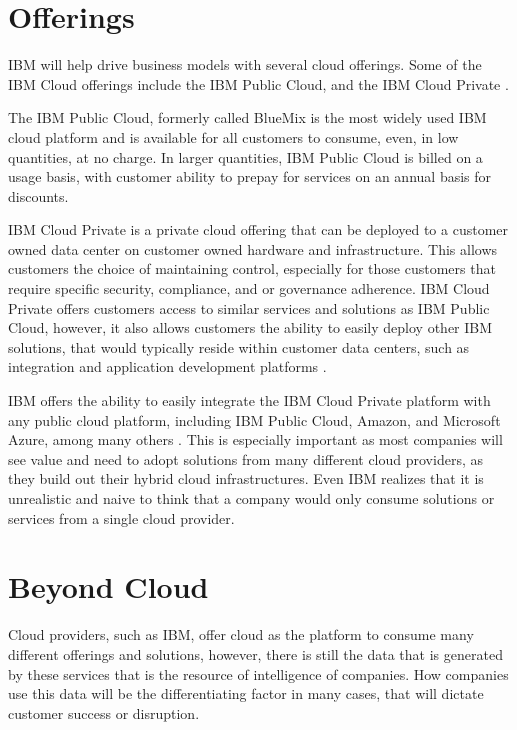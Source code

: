 \section{Offerings}

IBM will help drive business models with several cloud offerings.  Some of the IBM Cloud offerings include the IBM Public Cloud, and the IBM Cloud Private \cite{hid-sp18-525-winning}.  

The IBM Public Cloud, formerly called BlueMix is the most widely used IBM cloud platform and is available for all customers to consume, even, in low quantities, at no charge. In larger quantities, IBM Public Cloud is billed on a usage basis, with customer ability to prepay for services on an annual basis for discounts.  

IBM Cloud Private is a private cloud offering that can be deployed to a customer owned data center on customer owned hardware and infrastructure.  This allows customers the choice of maintaining control, especially for those customers that require specific security, compliance, and or governance adherence.  IBM Cloud Private offers customers access to similar services and solutions as IBM Public Cloud, however, it also allows customers the ability to easily deploy other IBM solutions, that would typically reside within customer data centers, such as integration and application development platforms \cite{hid-sp18-525-winning}.  

IBM offers the ability to easily integrate the IBM Cloud Private platform with any public cloud platform, including IBM Public Cloud, Amazon, and Microsoft Azure, among many others \cite{hid-sp18-525-winning}.  This is especially important as most companies will see value and need to adopt solutions from many different cloud providers, as they build out their hybrid cloud infrastructures.  Even IBM realizes that it is unrealistic and naive to think that a company would only consume solutions or services from a single cloud provider.    

\section{Beyond Cloud}

Cloud providers, such as IBM, offer cloud as the platform to consume many different offerings and solutions, however, there is still the data that is generated by these services that is the resource of intelligence of companies.  How companies use this data will be the differentiating factor in many cases, that will dictate customer success or disruption.

